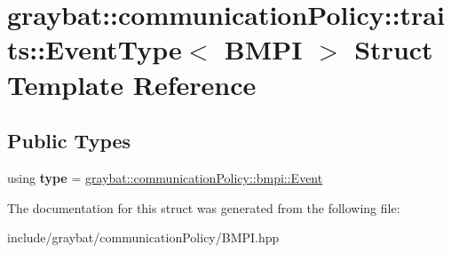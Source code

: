 \hypertarget{structgraybat_1_1communicationPolicy_1_1traits_1_1EventType_3_01BMPI_01_4}{}\section{graybat\+:\+:communication\+Policy\+:\+:traits\+:\+:Event\+Type$<$ B\+M\+P\+I $>$ Struct Template Reference}
\label{structgraybat_1_1communicationPolicy_1_1traits_1_1EventType_3_01BMPI_01_4}
\subsection*{Public Types}
\begin{DoxyCompactItemize}
\item 
\hypertarget{structgraybat_1_1communicationPolicy_1_1traits_1_1EventType_3_01BMPI_01_4_a5941c133a24f6eaa734f79cb8c580dbb}{}using {\bfseries type} = \hyperlink{classgraybat_1_1communicationPolicy_1_1bmpi_1_1Event}{graybat\+::communication\+Policy\+::bmpi\+::\+Event}\label{structgraybat_1_1communicationPolicy_1_1traits_1_1EventType_3_01BMPI_01_4_a5941c133a24f6eaa734f79cb8c580dbb}

\end{DoxyCompactItemize}


The documentation for this struct was generated from the following file\+:\begin{DoxyCompactItemize}
\item 
include/graybat/communication\+Policy/B\+M\+P\+I.\+hpp\end{DoxyCompactItemize}
